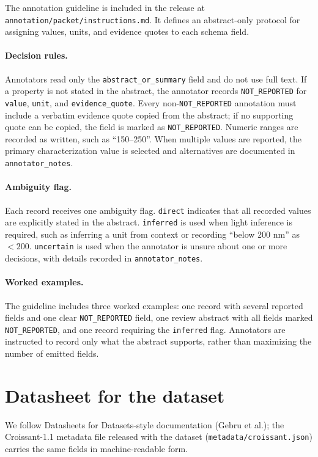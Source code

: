 \documentclass{article}
\newcommand{\NR}{\texttt{NOT\_REPORTED}}
\begin{document}
The annotation guideline is included in the release at
\texttt{annotation/packet/instructions.md}. It defines an
abstract-only protocol for assigning values, units, and evidence
quotes to each schema field.

\paragraph{Decision rules.}
Annotators read only the \texttt{abstract\_or\_summary} field and do
not use full text. If a property is not stated in the abstract, the
annotator records \NR{} for \texttt{value}, \texttt{unit}, and
\texttt{evidence\_quote}. Every non-\NR{} annotation must include a
verbatim evidence quote copied from the abstract; if no supporting
quote can be copied, the field is marked as \NR{}. Numeric ranges are
recorded as written, such as ``150--250''. When multiple values are
reported, the primary characterization value is selected and
alternatives are documented in \texttt{annotator\_notes}.

\paragraph{Ambiguity flag.}
Each record receives one ambiguity flag. \texttt{direct} indicates
that all recorded values are explicitly stated in the abstract.
\texttt{inferred} is used when light inference is required, such as
inferring a unit from context or recording ``below 200 nm'' as
$<200$. \texttt{uncertain} is used when the annotator is unsure about
one or more decisions, with details recorded in
\texttt{annotator\_notes}.

\paragraph{Worked examples.}
The guideline includes three worked examples: one record with several
reported fields and one clear \NR{} field, one review abstract with
all fields marked \NR{}, and one record requiring the
\texttt{inferred} flag. Annotators are instructed to record only what
the abstract supports, rather than maximizing the number of emitted
fields.


\section{Datasheet for the dataset}
\label{app:datasheet}

We follow Datasheets for Datasets-style documentation (Gebru et al.);
the Croissant-1.1 metadata file released with the dataset
(\texttt{metadata/croissant.json}) carries the same fields in
machine-readable form.
\end{document}
